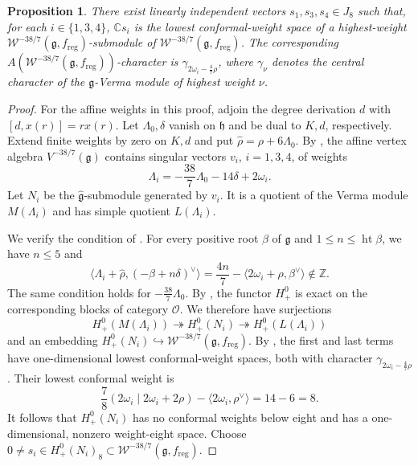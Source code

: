 \documentclass[11pt]{amsart}
\numberwithin{equation}{section}
\newtheorem{proposition}[theorem]{Proposition}
\theoremstyle{definition}
\theoremstyle{remark}
\newcommand{\g}{\mathfrak g}
\newcommand{\h}{\mathfrak h}
\newcommand{\W}{\mathcal W}
\newcommand{\reg}{\mathrm{reg}}
\begin{document}
\begin{proposition}\label{prop:sing-v-existence}
	There exist linearly independent vectors $s_1,s_3,s_4\in J_8$
	such that, for each $i\in\{1,3,4\}$,  $\mathbb Cs_i$
	is the lowest conformal-weight space of a highest-weight
	$\mathcal W^{-38/7}(\g,f_{\mathrm{reg}})$-submodule of $\mathcal W^{-38/7}(\g,f_{\mathrm{reg}})$. The corresponding $A(\mathcal W^{-38/7}(\g,f_{\mathrm{reg}}))$-character is
	$\gamma_{2\omega_i-\frac47\rho}$, where $\gamma_\nu$ denotes
	the central character of the $\mathfrak g$-Verma module of highest weight $\nu$.
\end{proposition}
\begin{proof}
For the affine weights in this proof, adjoin the degree derivation $d$
with $[d,x(r)]=r x(r)$. Let $\Lambda_0,\delta$ vanish on $\h$ and
be dual to $K,d$, respectively. Extend finite weights by zero on $K,d$
and put $\widehat\rho=\rho+6\Lambda_0$.
By \cite[Theorem~1.2(5)]{JS}, the affine vertex algebra
	$V^{-38/7}(\g)$ contains singular vectors $v_i$, $i=1,3,4$,
	of weights
	\[
	\Lambda_i=-\frac{38}{7}\Lambda_0-14\delta+2\omega_i.
	\]
	Let $N_i$ be the $\widehat{\mathfrak g}$-submodule generated by $v_i$.
	It is a quotient of the Verma module $M(\Lambda_i)$ and has
	simple quotient $L(\Lambda_i)$.
	
	We verify the condition of \cite[(385)]{Ara07}. For every positive
	root $\beta$ of $\mathfrak g$ and $1\le n\le\operatorname{ht}\beta$,
	we have $n\le5$ and
	\begin{equation}
		\big\langle\Lambda_i+\widehat\rho,(-\beta+n\delta)^\vee\big\rangle
		=\frac{4n}{7}-\langle 2\omega_i+\rho,\beta^\vee\rangle
		\notin\mathbb Z.
	\end{equation}
	The same condition holds for $-\frac{38}{7}\Lambda_0$.
	By \cite[Theorem 9.1.3]{Ara07}, the functor $H^0_+$
	is exact on the corresponding blocks of category $\mathcal O$.
	We therefore have surjections
	\[
	H^0_+(M(\Lambda_i))\twoheadrightarrow H^0_+(N_i)
	\twoheadrightarrow H^0_+(L(\Lambda_i))
	\]
	and an embedding $H^0_+(N_i)\hookrightarrow \mathcal W^{-38/7}(\g,f_{\mathrm{reg}})$.
	By \cite[Propositions 9.2.1 and 9.2.3, Lemma 9.2.4]{Ara07},
	the first and last terms have one-dimensional lowest
	conformal-weight spaces, both with character
	$\gamma_{2\omega_i-\frac47\rho}$. Their lowest conformal weight is
	\[
	\frac78(2\omega_i\mid 2\omega_i+2\rho)
	-\langle 2\omega_i,\rho^\vee\rangle=14-6=8.
	\]
	It follows that $H^0_+(N_i)$ has no conformal weights below
	eight and has a one-dimensional, nonzero weight-eight space.
Choose $0\ne s_i\in H^0_+(N_i)_8\subset\W^{-38/7}(\g,f_{\reg})$.
	

\end{proof}
\end{document}
